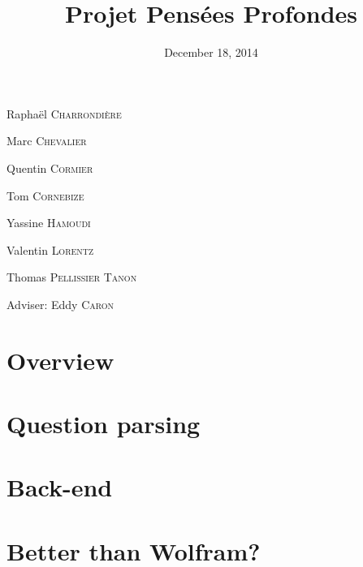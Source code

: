 \documentclass[10pt, compress]{beamer}
\title{Projet Pensées Profondes}
\subtitle{}
\date{December 18, 2014}
\institute{École Normale Supérieure de Lyon}
\begin{document}
\maketitle

\begin{frame}[fragile]
Raphaël \textsc{Charrondière}

Marc \textsc{Chevalier}

Quentin \textsc{Cormier}

Tom \textsc{Cornebize}

Yassine \textsc{Hamoudi}

Valentin \textsc{Lorentz}

Thomas \textsc{Pellissier} \textsc{Tanon}

\alert{Adviser:} Eddy \textsc{Caron}
\end{frame}



\section{Overview}


\section{Question parsing}









\section{Back-end}





\section{Better than Wolfram?}

\end{document}
